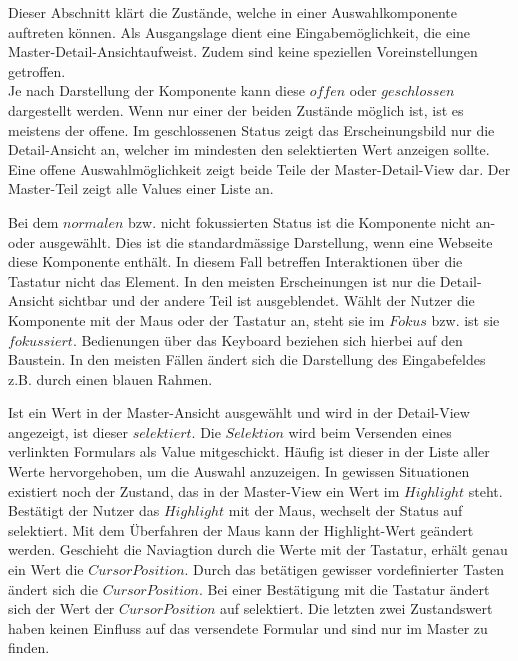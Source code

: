 Dieser Abschnitt klärt die Zustände, welche in einer Auswahlkomponente auftreten können.
Als Ausgangslage dient eine Eingabemöglichkeit, die eine Master-Detail-Ansicht\footnotemark aufweist.
Zudem sind keine speziellen Voreinstellungen getroffen.
\\
Je nach Darstellung der Komponente kann diese $offen$ oder $geschlossen$ dargestellt werden.
Wenn nur einer der beiden Zustände möglich ist, ist es meistens der offene.
Im geschlossenen Status zeigt das Erscheinungsbild nur die Detail-Ansicht an, welcher im mindesten den selektierten Wert anzeigen sollte.
Eine offene Auswahlmöglichkeit zeigt beide Teile der Master-Detail-View dar.
Der Master-Teil zeigt alle Values einer Liste an.

Bei dem $normalen$ bzw. nicht fokussierten Status ist die Komponente nicht an- oder ausgewählt.
Dies ist die standardmässige Darstellung, wenn eine Webseite diese Komponente enthält.
In diesem Fall betreffen Interaktionen über die Tastatur nicht das Element.
In den meisten Erscheinungen ist nur die Detail-Ansicht sichtbar und der andere Teil ist ausgeblendet.
Wählt der Nutzer die Komponente mit der Maus oder der Tastatur an, steht sie im $Fokus$ bzw. ist sie $fokussiert$.
Bedienungen über das Keyboard beziehen sich hierbei auf den Baustein.
In den meisten Fällen ändert sich die Darstellung des Eingabefeldes z.B. durch einen blauen Rahmen.

Ist ein Wert in der Master-Ansicht ausgewählt und wird in der Detail-View angezeigt, ist dieser $selektiert$.
Die $Selektion$ wird beim Versenden eines verlinkten Formulars als Value mitgeschickt.
Häufig ist dieser in der Liste aller Werte hervorgehoben, um die Auswahl anzuzeigen.
In gewissen Situationen existiert noch der Zustand, das in der Master-View ein Wert im $Highlight$ steht. 
Bestätigt der Nutzer das $Highlight$ mit der Maus, wechselt der Status auf selektiert.
Mit dem Überfahren der Maus kann der Highlight-Wert geändert werden.
Geschieht die Naviagtion durch die Werte mit der Tastatur, erhält genau ein Wert die $Cursor Position$. 
Durch das betätigen gewisser vordefinierter Tasten ändert sich die $Cursor Position$.
Bei einer Bestätigung mit die Tastatur ändert sich der Wert der $Cursor Position$ auf selektiert.
Die letzten zwei Zustandswert haben keinen Einfluss auf das versendete Formular und sind nur im Master zu finden.

